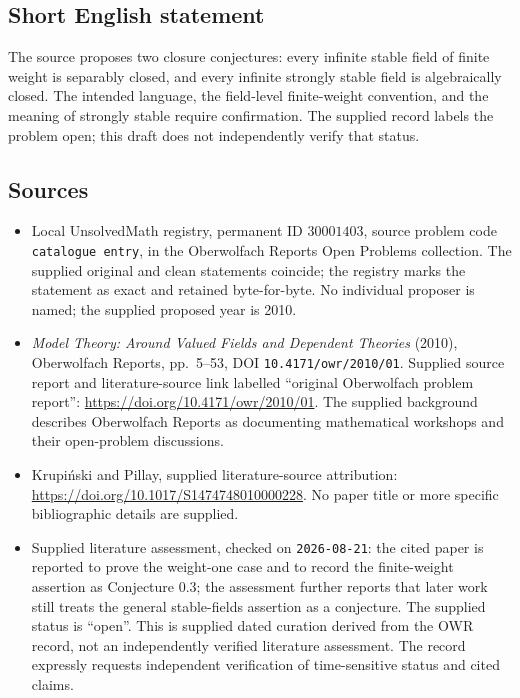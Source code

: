 \documentclass[11pt]{article}
\begin{document}
\subsection{Short English statement}
The source proposes two closure conjectures: every infinite stable field of finite weight is separably closed, and every infinite strongly stable field is algebraically closed. The intended language, the field-level finite-weight convention, and the meaning of strongly stable require confirmation. The supplied record labels the problem open; this draft does not independently verify that status.
\subsection{Sources}
\begin{itemize}
\item Local UnsolvedMath registry, permanent ID \(30001403\), source problem code \texttt{catalogue entry}, in the Oberwolfach Reports Open Problems collection. The supplied original and clean statements coincide; the registry marks the statement as exact and retained byte-for-byte. No individual proposer is named; the supplied proposed year is 2010.
\item \emph{Model Theory: Around Valued Fields and Dependent Theories} (2010), Oberwolfach Reports, pp.\ 5--53, DOI \texttt{10.4171/owr/2010/01}. Supplied source report and literature-source link labelled ``original Oberwolfach problem report'': \url{https://doi.org/10.4171/owr/2010/01}. The supplied background describes Oberwolfach Reports as documenting mathematical workshops and their open-problem discussions.
\item Krupiński and Pillay, supplied literature-source attribution: \url{https://doi.org/10.1017/S1474748010000228}. No paper title or more specific bibliographic details are supplied.
\item Supplied literature assessment, checked on \texttt{2026-08-21}: the cited paper is reported to prove the weight-one case and to record the finite-weight assertion as Conjecture 0.3; the assessment further reports that later work still treats the general stable-fields assertion as a conjecture. The supplied status is ``open''. This is supplied dated curation derived from the OWR record, not an independently verified literature assessment. The record expressly requests independent verification of time-sensitive status and cited claims.
\end{itemize}
\end{document}
